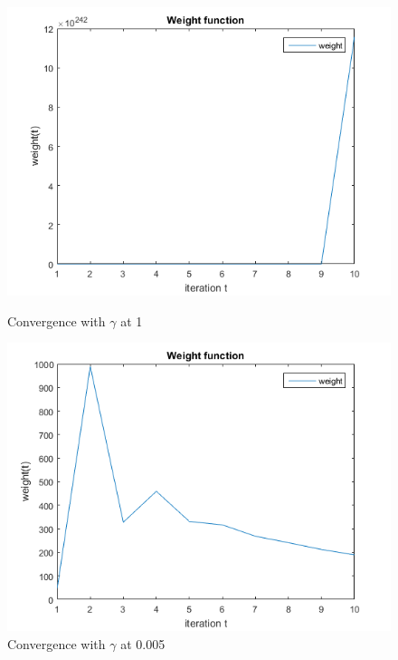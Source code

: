 \begin{figure}[!ht]
	\begin{minipage}{0.5 \textwidth}
		\centering
		\includegraphics[width=1\textwidth]{img/WeightFunction1}
		\caption{Convergence with $\gamma$ at 1}
		\label{fig:weight1}
	\end{minipage}
	\begin{minipage}{0.5 \textwidth}
		\centering
		\includegraphics[width=1\textwidth]{img/WeightFunction01}
		\caption{Convergence with $\gamma$ at 0.005}
		\label{fig:weight05}
	\end{minipage}
\end{figure}


